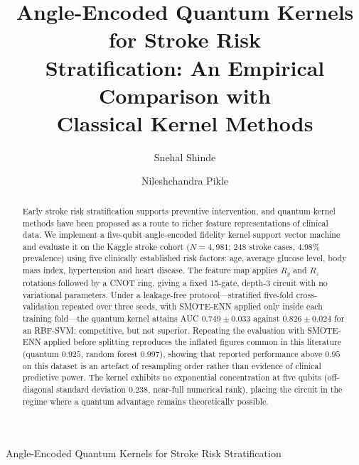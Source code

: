 \documentclass{ws-ijqi}
\begin{document}
         {Angle-Encoded Quantum Kernels for Stroke Risk Stratification}

\title{Angle-Encoded Quantum Kernels for Stroke Risk\\
       Stratification: An Empirical Comparison with\\
       Classical Kernel Methods}

\author{Snehal Shinde}
\address{Department of Computer Science and Engineering,\\
Indian Institute of Information Technology, Nagpur,\\
Maharashtra 441108, India\\
ssnehalbshinde@gmail.com}

\author{Nileshchandra Pikle}
\address{Department of Computer Science and Engineering,\\
Indian Institute of Information Technology, Nagpur,\\
Maharashtra 441108, India\\
nilesh.pikle@gmail.com}

\maketitle

\begin{history}
\end{history}

\begin{abstract}
Early stroke risk stratification supports preventive intervention, and quantum
kernel methods have been proposed as a route to richer feature representations
of clinical data. We implement a five-qubit angle-encoded fidelity kernel
support vector machine and evaluate it on the Kaggle stroke cohort
($N=4{,}981$; 248 stroke cases, 4.98\% prevalence) using five clinically
established risk factors: age, average glucose level, body mass index,
hypertension and heart disease. The feature map applies $R_y$ and $R_z$
rotations followed by a CNOT ring, giving a fixed 15-gate, depth-3 circuit with
no variational parameters. Under a leakage-free protocol---stratified five-fold
cross-validation repeated over three seeds, with SMOTE-ENN applied only inside
each training fold---the quantum kernel attains AUC $0.749\pm0.033$ against
$0.826\pm0.024$ for an RBF-SVM: competitive, but not superior. Repeating the
evaluation with SMOTE-ENN applied before splitting reproduces the inflated
figures common in this literature (quantum $0.925$, random forest $0.997$),
showing that reported performance above $0.95$ on this dataset is an artefact
of resampling order rather than evidence of clinical predictive power. The
kernel exhibits no exponential concentration at five qubits (off-diagonal
standard deviation $0.238$, near-full numerical rank), placing the circuit in
the regime where a quantum advantage remains theoretically possible.
\end{abstract}
\end{document}
